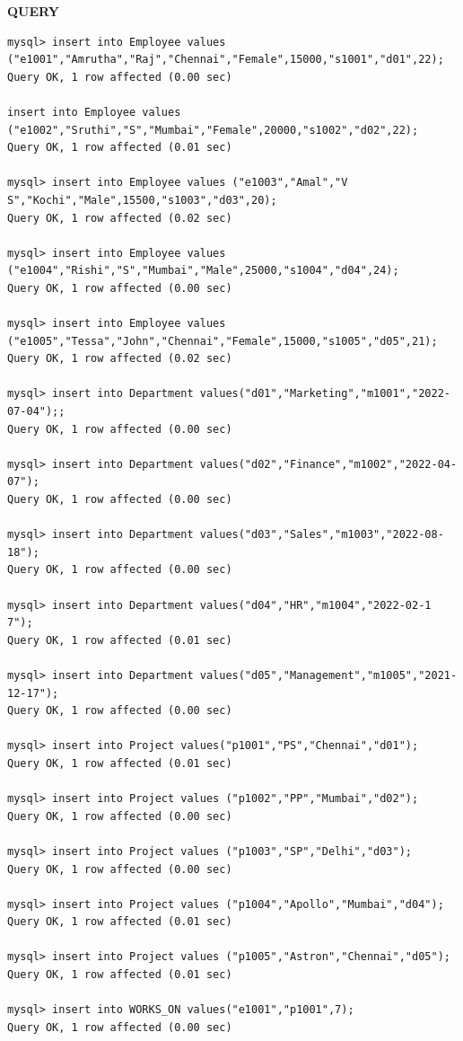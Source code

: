 \documentclass[a4paper,12pt]{report}
\begin{document}
	\begin{flushleft}
		\textbf{QUERY }
	\end{flushleft}
\begin{verbatim}
mysql> insert into Employee values ("e1001","Amrutha","Raj","Chennai","Female",15000,"s1001","d01",22);
Query OK, 1 row affected (0.00 sec)

insert into Employee values ("e1002","Sruthi","S","Mumbai","Female",20000,"s1002","d02",22);
Query OK, 1 row affected (0.01 sec)

mysql> insert into Employee values ("e1003","Amal","V S","Kochi","Male",15500,"s1003","d03",20);
Query OK, 1 row affected (0.02 sec)

mysql> insert into Employee values ("e1004","Rishi","S","Mumbai","Male",25000,"s1004","d04",24);
Query OK, 1 row affected (0.00 sec)

mysql> insert into Employee values ("e1005","Tessa","John","Chennai","Female",15000,"s1005","d05",21);
Query OK, 1 row affected (0.02 sec)

mysql> insert into Department values("d01","Marketing","m1001","2022-07-04");;
Query OK, 1 row affected (0.00 sec)

mysql> insert into Department values("d02","Finance","m1002","2022-04-07");
Query OK, 1 row affected (0.00 sec)

mysql> insert into Department values("d03","Sales","m1003","2022-08-18");
Query OK, 1 row affected (0.00 sec)

mysql> insert into Department values("d04","HR","m1004","2022-02-1
7");
Query OK, 1 row affected (0.01 sec)

mysql> insert into Department values("d05","Management","m1005","2021-12-17");
Query OK, 1 row affected (0.00 sec)

mysql> insert into Project values("p1001","PS","Chennai","d01");
Query OK, 1 row affected (0.01 sec)

mysql> insert into Project values ("p1002","PP","Mumbai","d02");
Query OK, 1 row affected (0.00 sec)

mysql> insert into Project values ("p1003","SP","Delhi","d03");
Query OK, 1 row affected (0.00 sec)

mysql> insert into Project values ("p1004","Apollo","Mumbai","d04");
Query OK, 1 row affected (0.01 sec)

mysql> insert into Project values ("p1005","Astron","Chennai","d05");
Query OK, 1 row affected (0.01 sec)

mysql> insert into WORKS_ON values("e1001","p1001",7);
Query OK, 1 row affected (0.00 sec)


\end{verbatim}
\end{document}
